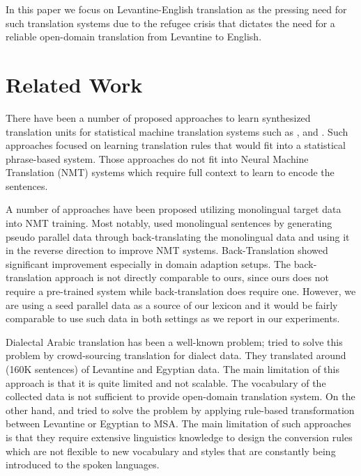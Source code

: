 \documentclass[a4paper]{article}
\begin{document}
In this paper we focus on Levantine-English translation as the pressing need for such translation systems due to the  refugee crisis that dictates  the need for  a reliable open-domain  translation  from Levantine to English. 





\section{Related Work}
\label{sec:rel}

There have been a number of proposed approaches to learn synthesized  translation units for statistical machine translation systems such as \cite{Klementiev}, \cite{SalujaHTQ14} and \cite{ZhaoHA15}. Such approaches focused on learning translation rules that would fit into a statistical phrase-based system. Those approaches do not fit into Neural Machine Translation (NMT) systems which require full context to learn to encode the sentences. 

A number of approaches  have been proposed utilizing monolingual target data into NMT training. Most notably, \cite{SennrichHB16} used  monolingual sentences by generating  pseudo parallel data through back-translating the monolingual data and using it in the reverse direction to improve NMT systems. Back-Translation  showed significant improvement especially in domain adaption setups.  The  back-translation approach  is not directly comparable to ours,  since ours does not require a pre-trained  system while back-translation does require one. However, we are using a seed parallel data as a source of our lexicon and it  would be fairly comparable to use such data in both settings as we report in our experiments. 

Dialectal Arabic translation has been a well-known problem; \cite{ZbibMDSMSMZC12} tried to solve this problem by crowd-sourcing translation for dialect data. They translated around (160K sentences) of Levantine and Egyptian data. The main limitation of this approach is that it is quite limited and not scalable. The vocabulary of the collected data is not sufficient to provide open-domain translation system. 
On the other hand, \cite{Durrani2014} and \cite{SajjadDGNAVSKH16} tried to solve the problem by applying rule-based transformation between Levantine or Egyptian to MSA. The main limitation of such approaches  is that they require extensive  linguistics knowledge to design the conversion rules which are not flexible to new vocabulary and styles that are constantly being introduced to the spoken languages.
\end{document}
